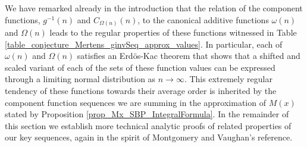 \documentclass[11pt,reqno,a4letter]{article}
\numberwithin{figure}{section}
\numberwithin{table}{section}
\theoremstyle{plain}
\numberwithin{theorem}{section}
\theoremstyle{definition}
\begin{document}
We have remarked already in the introduction that the relation of the component 
functions, $g^{-1}(n)$ and $C_{\Omega(n)}(n)$, to the canonical additive functions 
$\omega(n)$ and $\Omega(n)$ leads to the regular properties of these functions 
witnessed in Table \ref{table_conjecture_Mertens_ginvSeq_approx_values}. 
In particular, each of $\omega(n)$ and $\Omega(n)$ satisfies 
an Erd\"os-Kac theorem that shows that a shifted and scaled variant of each 
of the sets of these function values can be expressed through a 
limiting normal distribution as $n \rightarrow \infty$. This extremely regular 
tendency of these functions towards their average order is inherited by the component 
function sequences we are summing in the approximation of $M(x)$ stated by 
Proposition \ref{prop_Mx_SBP_IntegralFormula}. 
In the remainder of this section we establish more technical analytic proofs of 
related properties of our key sequences, again in the spirit of 
Montgomery and Vaughan's reference. 
\end{document}

